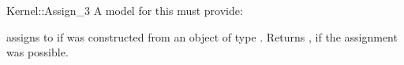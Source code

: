\begin{ccRefFunctionObjectConcept}{Kernel::Assign_3}
A model for this must provide:


{assigns  to  if 
was constructed from an object of type .
Returns , if the assignment was possible.}

\ccSeeAlso
{}

\end{ccRefFunctionObjectConcept}
